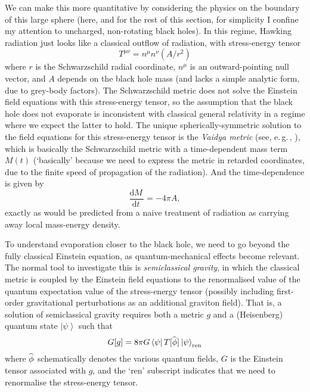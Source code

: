 \documentclass[12pt]{article}
\newcommand{\egc}{\mbox{e.\,g.\,}}
\newcommand{\dr}[1]{\ensuremath{\mathrm{d} #1\,}}
\newcommand{\dbd}[2]{\ensuremath{\frac{\dr{#1}}{\dr{#2}}}}
\newcommand{\ket}[1]{\ensuremath{\left|  #1 \right\rangle}}
\newcommand{\bra}[1]{\ensuremath{\left\langle #1 \right|}}
\newcommand{\matel}[3]{\ensuremath{\bra{#1} #2 \ket{#3}}}
\newcommand{\op}[1]{\ensuremath{\widehat{\textsf{\ensuremath{#1}}}}}
\newcommand{\be}{\begin{equation}}
\newcommand{\ee}{\end{equation}}
\begin{document}
We can make this more quantitative by considering the physics on the boundary of this large sphere (here, and for the rest of this section, for simplicity I confine my attention to uncharged, non-rotating black holes). In this regime, Hawking radiation just looks like a classical outflow of radiation, with stress-energy tensor
\be
T^{\mu\nu}=n^\mu n^\nu (A/r^2)
\ee
where $r$ is the Schwarzschild radial coordinate, $n^\mu$ is an outward-pointing null vector, and $A$ depends on the black hole mass (and lacks a simple analytic form, due to grey-body factors). The Schwarzschild metric does not solve the Einstein field equations with this stress-energy tensor, so the assumption that the black hole does not evaporate is inconsistent with classical general relativity in a regime where we expect the latter to hold. The unique spherically-symmetric solution to the field equations for this stress-energy tensor is the \emph{Vaidya metric} (see, \egc, ), which is basically the Schwarzschild metric with a time-dependent mass term $M(t)$ (`basically' because we need to express the metric in retarded coordinates, due to the finite speed of propagation of the radiation). And the time-dependence is given by
\be
\dbd{M}{t} = - 4\pi A,
\ee
exactly as would be predicted from a naive treatment of radiation as carrying away local mass-energy density.

To understand evaporation closer to the black hole, we need to go beyond the fully classical Einstein equation, as quantum-mechanical effects become relevant. The normal tool to investigate this is \emph{semiclassical gravity}, in which the classical metric is coupled by the Einstein field equations to the renormalised value of the quantum expectation value of the stress-energy tensor (possibly including first-order gravitational perturbations as an additional graviton field). That is, a solution of semiclassical gravity requires both a metric $g$ and a (Heisenberg) quantum state $\ket{\psi}$ such that
\be
G[g] = 8 \pi G \matel{\psi}{T[\op{\phi}]}{\psi}_{\mathrm{ren}}
\ee
where $\op{\phi}$ schematically denotes the various quantum fields, $G$ is the Einstein tensor associated with $g$, and the `ren' subscript indicates that we need to renormalise the stress-energy tensor.
\end{document}
